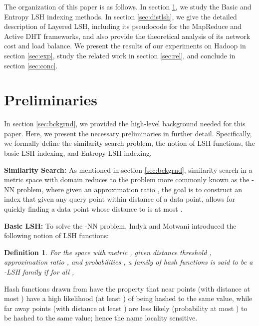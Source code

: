 \documentclass{acm_proc_article-sp}
\numberwithin{equation}{section}
\numberwithin{figure}{section}
\newtheorem{defn}[thm]{Definition}
\begin{document}
The organization of this paper is as follows. 
In section \ref{sec:prelim}, we study the Basic and Entropy LSH indexing methods. In section \ref{sec:distlsh}, we give the detailed description of Layered LSH, including its pseudocode for the MapReduce and Active DHT frameworks, and also provide the theoretical analysis of its network cost and load balance. We present the results of our experiments on Hadoop in section \ref{sec:exp}, study the related work in section \ref{sec:rel}, and conclude in section \ref{sec:conc}. 

\section{Preliminaries}
\label{sec:prelim}

In section \ref{sec:bckgrnd}, we provided the high-level background needed for this paper. Here, we present the necessary preliminaries in further detail. Specifically, we formally define the similarity search problem, the notion of LSH functions, the basic LSH indexing, and Entropy LSH indexing.

\noindent \textbf{Similarity Search:} As mentioned in section \ref{sec:bckgrnd}, similarity search in a metric space with domain  reduces to the problem more commonly known as the -NN problem, where given an approximation ratio , the goal is to construct an index that given any query point  within distance  of a data point, allows for quickly finding a data point  whose distance to  is at most .



\noindent \textbf{Basic LSH:} To solve the -NN problem, Indyk and Motwani \cite{im98} introduced the following notion of LSH functions:

\newcommand{\norm}[1]{{\left\Vert#1\right\Vert}_2}
\newcommand{\probH}[1]{{\bf\mbox{\bf Pr}}_{\mathcal{H}}\left[#1\right]}
\newcommand{\etal}{{\em et al. }}
\begin{defn}
\label{def:LSH}
For the space  with metric ,  given distance threshold , approximation ratio , and probabilities , a family of hash functions  is said to be a -LSH family if for all , 

\end{defn}

Hash functions drawn from  have the property that near points (with distance at most ) have a high likelihood (at least ) of being hashed to the same value, while far away points (with distance at least ) are less likely (probability at most ) to be hashed to the same value; hence the name locality sensitive. 
\end{document}
